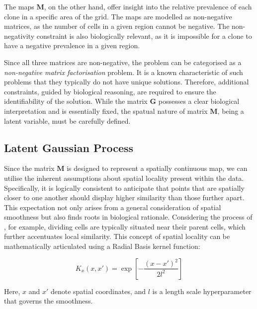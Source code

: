 The maps $\mathbf{M}$, on the other hand, offer insight into the relative prevalence of each clone in a specific area of the grid. The maps are modelled as non-negative matrices, as the number of cells in a given region cannot be negative. The non-negativity constraint is also biologically relevant, as it is impossible for a clone to have a negative prevalence in a given region.

Since all three matrices are non-negative, the problem can be categorised as a \emph{non-negative matrix factorisation} problem. It is a known characteristic of such problems that they typically do not have unique solutions. Therefore, additional constraints, guided by biological reasoning, are required to ensure the identifiability of the solution. While the matrix $\mathbf{G}$ possesses a clear biological interpretation and is essentially fixed, the spatual nature of matrix $\mathbf{M}$, being a latent variable, must be carefully defined.

\subsection{Latent Gaussian Process}

Since the matrix $\mathbf{M}$ is designed to represent a spatially continuous map, we can utilise the inherent assumptions about spatial locality present within the data. Specifically, it is logically consistent to anticipate that points that are spatially closer to one another should display higher similarity than those further apart. This expectation not only arises from a general consideration of spatial smoothness but also finds roots in biological rationale. Considering the process of , for example, dividing cells are typically situated near their parent cells, which further accentuates local similarity. This concept of spatial locality can be mathematically articulated using a Radial Basis kernel function:

\begin{equation}
    K_x(x,x') = \exp\left[ -\dfrac{(x-x')^2}{2l^2}\right]
\end{equation}

Here, $x$ and $x'$ denote spatial coordinates, and $l$ is a length scale hyperparameter that governs the smoothness.

